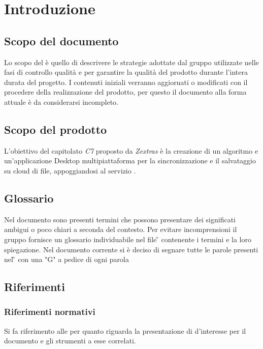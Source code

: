 \section{Introduzione}
\subsection{Scopo del documento}

Lo scopo del  \PdQ{}  è quello di descrivere le strategie adottate dal gruppo \gruppo{} utilizzate nelle fasi di controllo qualità e  per garantire la qualità del prodotto durante l'intera durata del progetto.  I contenuti iniziali verranno aggiornati o modificati con il procedere della realizzazione del prodotto,  per questo il documento alla forma attuale è da considerarsi incompleto.  

\subsection{Scopo del prodotto}

L'obiettivo del capitolato \textit{C7} proposto da \textit{Zextras} è la creazione di  un algoritmo e un'applicazione Desktop multipiattaforma per la sincronizzazione e il salvataggio su cloud di file,  appoggiandosi al servizio .  

\subsection{Glossario}

Nel documento sono presenti termini che possono presentare dei significati ambigui o poco chiari a seconda del contesto. Per evitare incomprensioni il gruppo fornisce un glossario individuabile nel file \G{} \versGlo{} contenente i termini e la loro spiegazione. Nel documento corrente si è deciso di segnare tutte le parole presenti nel \G{} con una "G" a pedice di ogni parola

\subsection{Riferimenti}
\subsubsection{Riferimenti normativi}
Si fa riferimento alle \NdP{} \versNdP{} per quanto riguarda la presentazione di  d'interesse per il documento e gli strumenti a esse correlati. 
